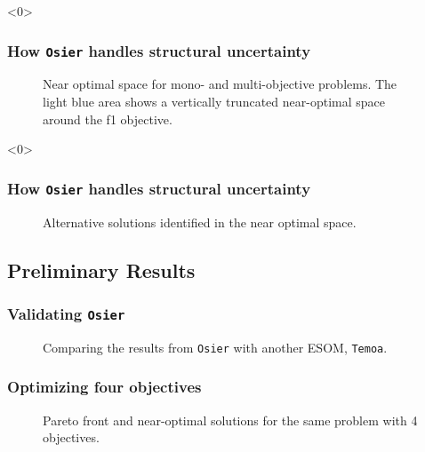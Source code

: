 \begin{frame}<0>
    \frametitle{How \texttt{Osier} handles structural uncertainty}
        \begin{figure}
            \centering
            \resizebox{0.75\columnwidth}{!}{}
            \caption{Near optimal space for mono- and multi-objective problems. The light blue area shows
            a vertically truncated near-optimal space around the f1 objective.}
            \label{fig:near-opt-mga}
        \end{figure}

\end{frame}

\begin{frame}<0>
    \frametitle{How \texttt{Osier} handles structural uncertainty}
        \begin{figure}
            \centering
            \resizebox{0.75\columnwidth}{!}{}
            \caption{Alternative solutions identified in the near optimal space.}
            \label{fig:nd-alt-points}
        \end{figure}

\end{frame}


\subsection{Preliminary Results}
\begin{frame}
    \frametitle{Validating \texttt{Osier}}

    \begin{figure}
        \centering 
        \resizebox{0.75\columnwidth}{!}{}
        \caption{Comparing the results from \texttt{Osier} with another ESOM, \texttt{Temoa}.}
        \label{fig:osier-temoa-benchmark-2}
    \end{figure}

\end{frame}



\begin{frame}
    \frametitle{Optimizing four objectives}

    \begin{figure}
        \centering 
        \resizebox{0.9\columnwidth}{!}{}
        \caption{Pareto front and near-optimal solutions for the same problem with 4 objectives.}
        \label{fig:4-obj-objective-space}
    \end{figure}

\end{frame}

